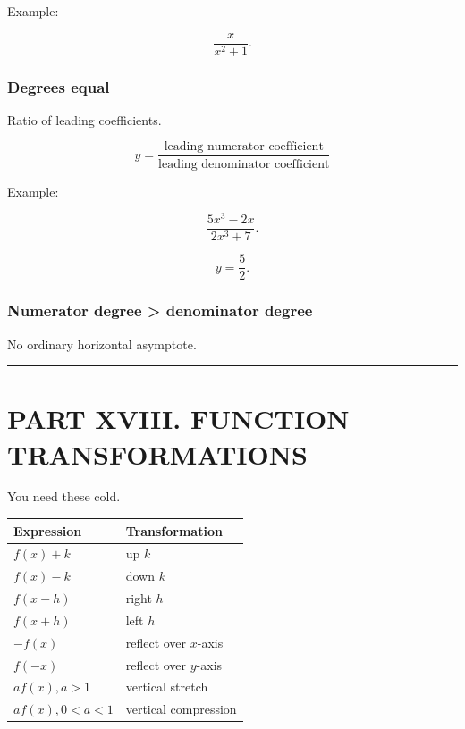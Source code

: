 \documentclass[
]{article}
\newcounter{none} %
\begin{document}
Example:

\[
\frac{x}{x^2+1}.
\]

\subsubsection{Degrees equal}\label{degrees-equal}

Ratio of leading coefficients.

\[
\boxed{
y=
\frac{\text{leading numerator coefficient}}
{\text{leading denominator coefficient}}
}
\]

Example:

\[
\frac{5x^3-2x}{2x^3+7}.
\]

\[
\boxed{y=\frac52}.
\]

\subsubsection{Numerator degree \textgreater{} denominator
degree}\label{numerator-degree-denominator-degree-1}

No ordinary horizontal asymptote.

\begin{center}\rule{0.5\linewidth}{0.5pt}\end{center}

\section{PART XVIII. FUNCTION
TRANSFORMATIONS}\label{part-xviii.-function-transformations}

You need these cold.

{\def\LTcaptype{none} %
\begin{longtable}[]{@{}ll@{}}
\toprule\noalign{}
Expression & Transformation \\
\midrule\noalign{}
\endhead
\bottomrule\noalign{}
\endlastfoot
\(f(x)+k\) & up \(k\) \\
\(f(x)-k\) & down \(k\) \\
\(f(x-h)\) & right \(h\) \\
\(f(x+h)\) & left \(h\) \\
\(-f(x)\) & reflect over \(x\)-axis \\
\(f(-x)\) & reflect over \(y\)-axis \\
\(af(x), a>1\) & vertical stretch \\
\(af(x),0<a<1\) & vertical compression \\
\end{longtable}
}
\end{document}
